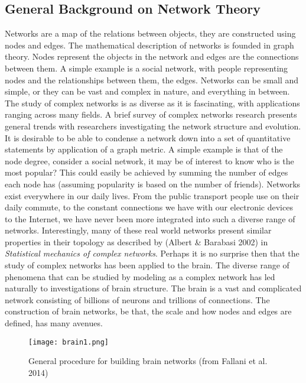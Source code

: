 \documentclass[11pt]{article}
\begin{document}
\subsection{General Background on Network Theory}
Networks are a map of the relations between objects, they are constructed using nodes and edges. The mathematical description of networks is founded in graph theory. Nodes represent the objects in the network and edges are the connections between them. A simple example is a social network, with people representing nodes and the relationships between them, the edges. Networks can be small and simple, or they can be vast and complex in nature, and everything in between. The study of complex networks is as diverse as it is fascinating, with applications ranging across many fields. A brief survey of complex networks research presents general trends with researchers investigating the network structure and evolution. It is desirable to be able to condense a network down into a set of quantitative statements by application of a graph metric. A simple example is that of the node degree, consider a social network, it may be of interest to know who is the most popular? This could easily be achieved by summing the number of edges each node has (assuming popularity is based on the number of friends). Networks exist everywhere in our daily lives. From the public transport people use on their daily commute, to the constant connections we have with our electronic devices to the Internet, we have never been more integrated into such a diverse range of networks. Interestingly, many of these real world networks present similar properties in their topology as described by (Albert \& Barabasi 2002) in \emph{Statistical mechanics of complex networks}. Perhaps it is no surprise then that the study of complex networks has been applied to the brain. The diverse range of phenomena that can be studied by modeling as a complex network has led naturally to investigations of brain structure. The brain is a vast and complicated network consisting of billions of neurons and trillions of connections. The construction of brain networks, be that, the scale and how nodes and edges are defined, has many avenues.
\begin{figure}[h!]%
\centering\texttt{[image: brain1.png]}%
\caption{General procedure for building brain networks (from Fallani et al. 2014)}
\label{b1}
\end{figure}
\end{document}

